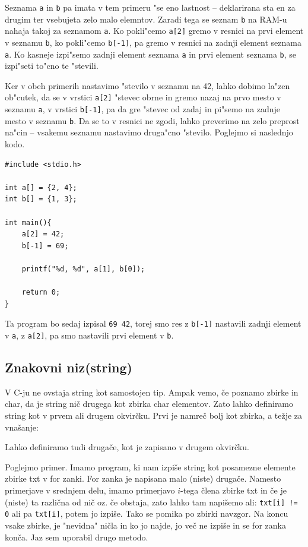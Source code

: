 \documentclass[a4paper, 12pt]{article}
\begin{document}
Seznama  \lstinline|a| in \lstinline|b| pa imata v tem primeru "se eno lastnost -- deklarirana sta en za drugim ter vsebujeta zelo malo elemntov. Zaradi tega se seznam \lstinline|b| na RAM-u nahaja takoj za seznamom \lstinline|a|. Ko pokli"cemo \lstinline|a[2]| gremo v resnici na prvi element v seznamu \texttt{b}, ko pokli"cemo \lstinline|b[-1]|, pa gremo v resnici na zadnji element seznama \texttt{a}. Ko kasneje izpi"semo zadnji element seznama \texttt{a} in prvi element seznama \texttt{b}, se izpi"seti to"cno te "stevili. 

Ker v obeh primerih nastavimo "stevilo v seznamu na 42, lahko dobimo la"zen ob"cutek, da se v vrstici \lstinline|a[2]| "stevec obrne in gremo nazaj na prvo mesto v seznamu \texttt{a}, v vrstici \lstinline|b[-1]|, pa da gre "stevec od zadaj in pi"semo na zadnje mesto v seznamu \texttt{b}. Da se to v resnici ne zgodi, lahko preverimo na zelo preprost na"cin -- vsakemu seznamu nastavimo druga"cno "stevilo. Poglejmo si naslednjo kodo.

\begin{lstlisting}[caption = Zbirke primer]
#include <stdio.h>

int a[] = {2, 4};
int b[] = {1, 3};

int main(){
	a[2] = 42;
	b[-1] = 69;

	printf("%d, %d", a[1], b[0]);

	return 0;
}
\end{lstlisting}

Ta program bo sedaj izpisal \texttt{69 42}, torej smo res z \lstinline|b[-1]| nastavili zadnji element v \texttt{a}, z \lstinline|a[2]|, pa smo nastavili prvi element v \texttt{b}.
%
\subsection{Znakovni niz(string)}
V C-ju ne ovstaja string kot samostojen tip. Ampak vemo, če poznamo zbirke in char, da je string nič drugega kot zbirka char elementov. Zato lahko definiramo string kot v prvem ali drugem okvirčku. Prvi je namreč bolj kot zbirka, a težje za vnašanje:
\begin{center}
\end{center}

Lahko definiramo tudi drugače, kot je zapisano v drugem okvirčku.

Poglejmo primer. Imamo program, ki nam izpiše string kot posamezne elemente zbirke txt v for zanki. For zanka je napisana malo (niste) drugače. Namesto primerjave v srednjem delu, imamo primerjavo $i$-tega člena zbirke txt in če je (niste) ta različna od nič oz. če obstaja, zato lahko tam napišemo ali: \texttt{txt[i] != 0} ali pa \texttt{txt[i]}, potem jo izpiše. Tako se pomika po zbirki navzgor. Na koncu vsake zbirke, je "nevidna" ničla in ko jo najde, jo več ne izpiše in se for zanka konča. Jaz sem uporabil drugo metodo.
\end{document}
